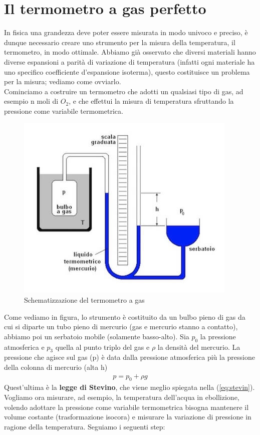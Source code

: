 \documentclass[10pt,a4paper]{article}
\begin{document}
\section{Il termometro a gas perfetto}\label{sec:termometroagasperfetto}
In fisica una grandezza deve poter essere misurata in modo univoco e preciso, è dunque necessario creare uno strumento per la misura della temperatura, il termometro, in modo ottimale. Abbiamo già osservato che diversi materiali hanno diverse espansioni a parità di variazione di temperatura (infatti ogni materiale ha uno specifico coefficiente d'espansione isoterma), questo costituisce un problema per la misura; vediamo come ovviarlo.\\
Cominciamo a costruire un termometro che adotti un qualsiasi tipo di gas, ad esempio n moli di $O_2$, e che effettui la misura di temperatura sfruttando la pressione come variabile termometrica.
\begin{figure}[h!]
	\centering
	\includegraphics[width=0.6\linewidth]{../images/termometro-a-gas}
	\caption{Schematizzazione del termometro a gas}
	\label{fig:termometro-a-gas}
\end{figure}
\FloatBarrier
Come vediamo in figura, lo strumento è costituito da un bulbo pieno di gas da cui si diparte un tubo pieno di mercurio (gas e mercurio stanno a contatto), abbiamo poi un serbatoio mobile (solamente basso-alto). Sia $p_0$ la pressione atmosferica e $p_3$ quella al punto triplo del gas e $\rho$ la densità del mercurio. La pressione che agisce sul gas (p) è data dalla pressione atmosferica più la pressione della colonna di mercurio (alta h)
\begin{align*} 
	p = p_0 + \rho g
\end{align*} 
Quest'ultima è la \textbf{legge di Stevino}, che viene meglio spiegata nella (\ref{eq:stevin}).\\
Vogliamo ora misurare, ad esempio, la temperatura dell'acqua in ebollizione, volendo adottare la pressione come variabile termometrica bisogna mantenere il volume costante (trasformazione isocora) e misurare la variazione di pressione in ragione della temperatura. Seguiamo i seguenti step:
\end{document}
